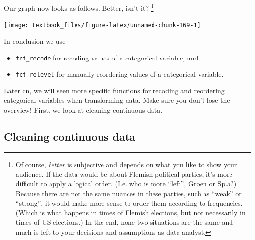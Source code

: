 \documentclass[]{tufte-book}
\newenvironment{Shaded}{}{}
\newcommand{\DataTypeTok}[1]{\textcolor[rgb]{0.56,0.13,0.00}{#1}}
\newcommand{\DecValTok}[1]{\textcolor[rgb]{0.25,0.63,0.44}{#1}}
\newcommand{\KeywordTok}[1]{\textcolor[rgb]{0.00,0.44,0.13}{\textbf{#1}}}
\newcommand{\NormalTok}[1]{#1}
\newcommand{\OperatorTok}[1]{\textcolor[rgb]{0.40,0.40,0.40}{#1}}
\newcommand{\StringTok}[1]{\textcolor[rgb]{0.25,0.44,0.63}{#1}}
\providecommand{\tightlist}{%
  \setlength{\itemsep}{0pt}\setlength{\parskip}{0pt}}
\begin{document}
Our graph now looks as follows. Better, isn't it? \footnote{Of course, \emph{better} is subjective and depends on what you like to show your audience. If the data would be about Flemish political parties, it's more difficult to apply a logical order. (I.e. who is more ``left'', Groen or Sp.a?) Because there are not the same nuances in these parties, such as ``weak'' or ``strong'', it would make more sense to order them according to frequencies. (Which is what happens in times of Flemish elections, but not necessarily in times of US elections.) In the end, none two situations are the same and much is left to your decisions and assumptions as data analyst.}

\begin{Shaded}
\end{Shaded}

\texttt{[image: textbook\_files/figure-latex/unnamed-chunk-169-1]}

In conclusion we use

\begin{itemize}
\tightlist
\item
  \texttt{fct\_recode} for recoding values of a categorical variable, and
\item
  \texttt{fct\_relevel} for manually reordering values of a categorical variable.
\end{itemize}

Later on, we will seen more specific functions for recoding and reordering categorical variables when transforming data. Make sure you don't lose the overview! First, we look at cleaning continuous data.

\hypertarget{cleaning-continuous-data}{%
\subsection{Cleaning continuous data}\label{cleaning-continuous-data}}
\end{document}
